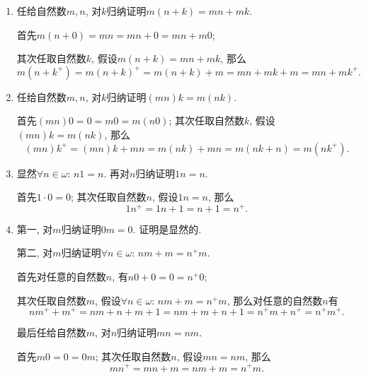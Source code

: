 \documentclass[UTF8]{ctexart}
\begin{document}
\begin{enumerate}
    \item 任给自然数$m,n$, 对$k$归纳证明$m(n+k)=mn+mk$.
    
    \hspace{2.17em}
    首先$m(n+0)=mn=mn+0=mn+m0$;
    
    \hspace{2.17em}
    其次任取自然数$k$, 假设$m(n+k)=mn+mk$, 那么
    \[
        m(n+k^+)=m(n+k)^+=m(n+k)+m=mn+mk+m=mn+mk^+.
    \]

    \item 任给自然数$m,n$, 对$k$归纳证明$(mn)k=m(nk)$.
    
    \hspace{2.17em}
    首先$(mn)0=0=m0=m(n0)$; 其次任取自然数$k$, 假设$(mn)k=m(nk)$, 那么
    \[
        (mn)k^+=(mn)k+mn=m(nk)+mn=m(nk+n)=m(nk^+).
    \]

    \item 显然$\forall n\in\omega:\,n1=n$. 再对$n$归纳证明$1n=n$.
    
    \hspace{2.17em}
    首先$1\cdot 0=0$; 其次任取自然数$n$, 假设$1n=n$, 那么
    \[
        1n^+=1n+1=n+1=n^+.
    \]

    \item 第一, 对$m$归纳证明$0m=0$. 证明是显然的.    
    
    \hspace{2.17em}
    第二, 对$m$归纳证明$\forall n\in\omega:\,nm+m=n^+m$.
    
    \hspace{2.17em}
    首先对任意的自然数$n$, 有$n0+0=0=n^+0$;
    
    \hspace{2.17em}
    其次任取自然数$m$,
    假设$\forall n\in\omega:\,nm+m=n^+m$, 那么对任意的自然数$n$有
    \[
        nm^++m^+=nm+n+m+1=nm+m+n+1=n^+m+n^+=n^+m^+.
    \]

    \hspace{2.17em}
    最后任给自然数$m$, 对$n$归纳证明$mn=nm$.
    
    \hspace{2.17em}
    首先$m0=0=0m$; 其次任取自然数$n$, 假设$mn=nm$, 那么
    \begin{equation*}
        mn^+=mn+m=nm+m=n^+m.
    \tag*{\qedsymbol}\end{equation*}
\end{enumerate}
\end{document}
